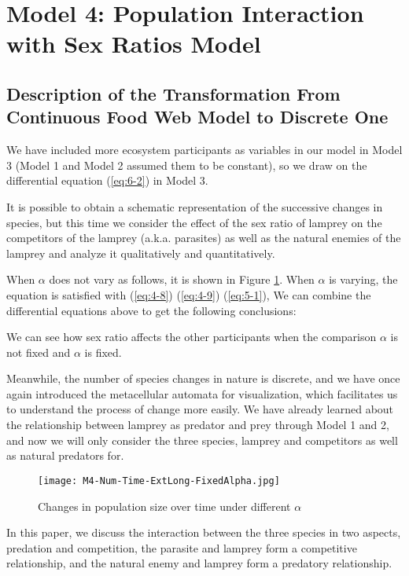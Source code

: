 \documentclass[12pt]{article}  %
\begin{document}
\section{Model 4: Population Interaction with Sex Ratios Model}
\subsection{Description of the Transformation From Continuous Food Web Model to Discrete One}
We have included more ecosystem participants as variables in our model in Model 3 (Model 1 and Model 2 assumed them to be constant), so we draw on the differential equation (\ref{eq:6-2}) in Model 3.

It is possible to obtain a schematic representation of the successive changes in species, but this time we consider the effect of the sex ratio of lamprey on the competitors of the lamprey (a.k.a. parasites) as well as the natural enemies of the lamprey and analyze it qualitatively and quantitatively.

When $\alpha$ does not vary as follows, it is shown in Figure \ref{fig:AM3}. When $\alpha$  is varying, the equation is satisfied with (\ref{eq:4-8}) (\ref{eq:4-9}) (\ref{eq:5-1}), We can combine the differential equations above to get the following conclusions:

We can see how sex ratio affects the other participants when the comparison $\alpha$ is not fixed and $\alpha$ is fixed.

Meanwhile, the number of species changes in nature is discrete, and we have once again introduced the metacellular automata for visualization, which facilitates us to understand the process of change more easily. We have already learned about the relationship between lamprey as predator and prey through Model 1 and 2, and now we will only consider the three species, lamprey and competitors as well as natural predators for.

\begin{figure}[htbp]
	\centering
	{\texttt{[image: M4-Num-Time-ExtLong-FixedAlpha.jpg]}\label{M4-Num-Time-ExtLong-FixedAlpha}}
	\caption{Changes in population size over time under different $\alpha$}
	\label{fig:AM3}
\end{figure}
In this paper, we discuss the interaction between the three species in two aspects, predation and competition, the parasite and lamprey form a competitive relationship, and the natural enemy and lamprey form a predatory relationship.
\end{document}
